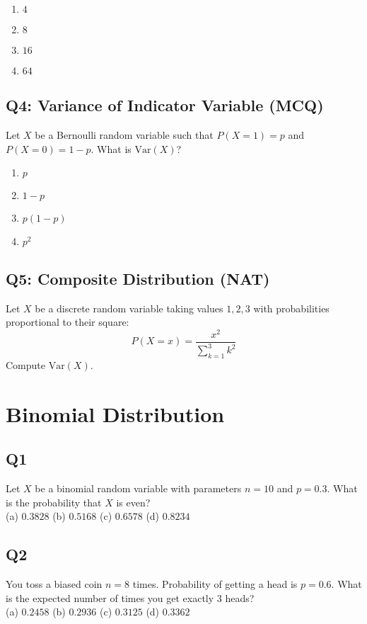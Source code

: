 \begin{enumerate}[label=(\alph*)]
\item $4$
\item $8$
\item $16$
\item $64$
\end{enumerate}

\subsection*{Q4: Variance of Indicator Variable (MCQ)}
Let $X$ be a Bernoulli random variable such that $P(X=1) = p$ and $P(X=0) = 1 - p$. What is $\text{Var}(X)$?

\begin{enumerate}[label=(\alph*)]
\item $p$
\item $1-p$
\item $p(1-p)$
\item $p^2$
\end{enumerate}

\subsection*{Q5: Composite Distribution (NAT)}
Let $X$ be a discrete random variable taking values $1, 2, 3$ with probabilities proportional to their square:
\[
P(X = x) = \dfrac{x^2}{\sum_{k=1}^3 k^2}
\]
Compute $\text{Var}(X)$.

\section{Binomial Distribution}

\subsection*{Q1}
Let $X$ be a binomial random variable with parameters $n = 10$ and $p = 0.3$. What is the probability that $X$ is even? \\ 
(a) $0.3828$ \quad (b) $0.5168$ \quad (c) $0.6578$ \quad (d) $0.8234$

\subsection*{Q2}
You toss a biased coin $n = 8$ times. Probability of getting a head is $p = 0.6$. What is the expected number of times you get exactly 3 heads? \\ 
(a) $0.2458$ \quad (b) $0.2936$ \quad (c) $0.3125$ \quad (d) $0.3362$


